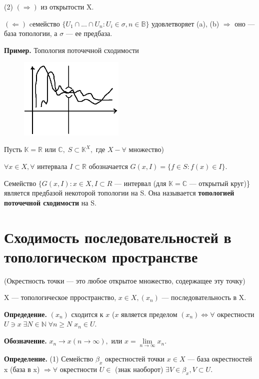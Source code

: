 \documentclass[12pt,a4paper]{article}
\begin{document}
(2) $(\Rightarrow)$ из открытости X. 

$(\Leftarrow)$ cемейство $\{U_{1} \cap ... \cap U_{n}: U_{i} \in \sigma, n \in \mathbb{B}\}$ удовлетворяет (a), (b) $\Rightarrow$ оно --- база топологии, а $\sigma$ --- ее предбаза. 
	
\textbf{Пример.} Топология поточечной сходимости

\begin{figure}
	\includegraphics[width = 5cm]{lect3_3.png}
\end{figure}

Пусть $\mathbb{K} = \mathbb{R}$ или $\mathbb{C}, \; S \subset \mathbb{K}^{X},$ где $X - \forall$ множество) 
	
$\forall x \in X, \forall$ интервала $I \subset \mathbb{R}$ обозначается $G(x, I) = \{f \in S: f(x) \in I\}.$ 
	
Семейство $\{G(x, I): x \in X, I \subset R$ --- интервал (для $\mathbb{K} = \mathbb{C}$ --- открытый круг)\} является предбазой некоторой топологии на S. Она называется \textbf{топологией поточечной сходимости} на S. 

\section{Сходимость последовательностей в топологическом пространстве}

(Окрестность точки --- это любое открытое множество, содержащее эту точку)

X --- топологическое прространство, $x \in X, (x_{n})$ --- последовательность в X. 

\textbf{Опредедение.} $(x_{n})$ сходится к $x$ ($x$ является пределом $(x_{n}) \Leftrightarrow \forall$ окрестности $U \ni x \; \exists N \in \mathbb{N} \; \forall n \geq N \; x_{n} \in U.$

\textbf{Обозначение.} $x_{n} \to x (n \to \infty),$ или $x = \underset{n \to \infty}{\lim} x_{n}.$ 

\textbf{Определение.} (1) Семейство $\beta_{x}$ окрестностей точки $x \in X$ --- база окрестностей x (база в x) $\Rightarrow \forall$ окрестности $U \in$ (знак наоборот) $\exists V \in \beta_{x}, V \subset U.$
\end{document}
